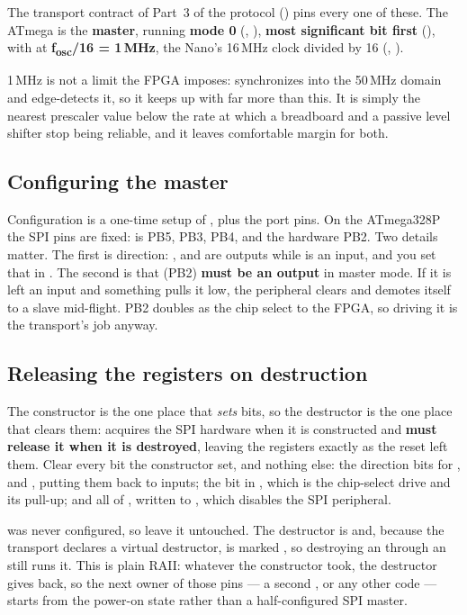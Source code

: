 The transport contract of Part~3 of the protocol () pins every one of these. The
ATmega is the \textbf{master}, running \textbf{mode 0} (, ),
\textbf{most significant bit first} (), with  at
\textbf{f\textsubscript{osc}/16 = 1\,MHz}, the Nano's 16\,MHz clock divided by 16
(, ).

1\,MHz is not a limit the FPGA imposes:  synchronizes  into the 50\,MHz
domain and edge-detects it, so it keeps up with far more than this. It is simply the nearest
prescaler value below the rate at which a breadboard and a passive level shifter stop being
reliable, and it leaves comfortable margin for both.

\subsection{Configuring the master}
\label{c9:sec:configuring}
Configuration is a one-time setup of , plus the port pins. On the ATmega328P the SPI pins
are fixed:  is PB5,  PB3,  PB4, and the hardware  PB2. Two
details matter. The first is direction: ,  and  are outputs while
 is an input, and you set that in . The second is that  (PB2)
\textbf{must be an output} in master mode. If it is left an input and something pulls it low, the
peripheral clears  and demotes itself to a slave mid-flight. PB2 doubles as the chip
select to the FPGA, so driving it is the transport's job anyway.

\subsection{Releasing the registers on destruction}
\label{c9:sec:releasing}
The constructor is the one place that \emph{sets} bits, so the destructor is the one place that
clears them:  acquires the SPI hardware when it is constructed and \textbf{must release
it when it is destroyed}, leaving the registers exactly as the reset left them. Clear every bit the
constructor set, and nothing else: the  direction bits for ,  and
, putting them back to inputs; the  bit in , which is the chip-select
drive and its pull-up; and all of , written to , which disables the SPI
peripheral.

 was never configured, so leave it untouched. The destructor is  and,
because the transport  declares a virtual destructor, is marked , so
destroying an  through an  still runs it. This is plain RAII: whatever
the constructor took, the destructor gives back, so the next owner of those pins --- a second
, or any other code --- starts from the power-on state rather than a half-configured SPI
master.

